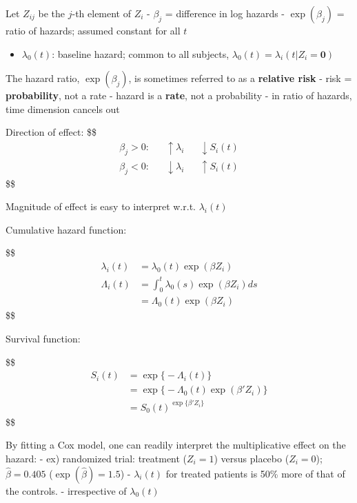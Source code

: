 \documentclass[
]{book}
\providecommand{\tightlist}{%
  \setlength{\itemsep}{0pt}\setlength{\parskip}{0pt}}
\theoremstyle{definition}
\theoremstyle{definition}
\theoremstyle{definition}
\theoremstyle{definition}
\theoremstyle{remark}
\begin{document}
Let \(Z_{ij}\) be the \(j\)-th element of \(Z_i\)
- \(\beta_j\) = difference in log hazards
- \(\exp(\beta_j)\) = ratio of hazards; assumed constant for all \(t\)

\begin{itemize}
\tightlist
\item
  \(\lambda_0(t)\): baseline hazard; common to all subjects, \(\lambda_0(t) = \lambda_i(t \big | Z_i = \mathbf 0)\)
\end{itemize}

The hazard ratio, \(\exp(\beta_j)\), is sometimes referred to as a \textbf{relative risk}
- risk = \textbf{probability}, not a rate
- hazard is a \textbf{rate}, not a probability
- in ratio of hazards, time dimension cancels out

Direction of effect:
\$\$
\begin{align}

\beta_j > 0: &&\uparrow\lambda_i &&\downarrow S_i(t)
\\
\beta_j < 0: &&\downarrow\lambda_i &&\uparrow S_i(t)


\end{align}
\$\$

Magnitude of effect is easy to interpret w.r.t. \(\lambda_i(t)\)

Cumulative hazard function:

\$\$
\begin{align}

\lambda_i (t) &= \lambda_0(t) \exp(\beta Z_i)
\\
\Lambda_i (t) &= \int_0^t \lambda_0(s) \exp(\beta Z_i) ds
\\
&= \Lambda_0(t) \exp(\beta Z_i)

\end{align}
\$\$

Survival function:

\$\$
\begin{align}
S_i (t) &= \exp \Big \{ -\Lambda_i (t) \Big\}
\\
&= \exp \Big \{ -\Lambda_0 (t) \exp(\beta ' Z_i)\Big\}
\\
&= S_0(t)^{\exp \Big \{ \beta'Z_i \Big\}}


\end{align}
\$\$

By fitting a Cox model, one can readily interpret the multiplicative effect on the hazard:
- ex) randomized trial: treatment (\(Z_i=1\)) versus placebo (\(Z_i=0\)); \(\hat \beta = 0.405\) (\(\exp(\hat \beta)=1.5\))
- \(\lambda_i(t)\) for treated patients is 50\% more of that of the controls.
- irrespective of \(\lambda_0(t)\)
\end{document}
